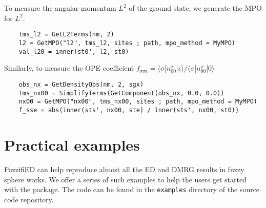 \documentclass{timesjhep}
\begin{document}
To measure the angular momentum $L^2$ of the ground state, we generate the MPO for $L^2$.
\begin{lstlisting}
    tms_l2 = GetL2Terms(nm, 2)
    l2 = GetMPO("l2", tms_l2, sites ; path, mpo_method = MyMPO)
    val_l20 = inner(st0', l2, st0)
\end{lstlisting}
Similarly, to measure the OPE coefficient $f_{\sigma\sigma\epsilon}=\langle \sigma|n^x_{00}|\epsilon\rangle/\langle \sigma|n^x_{00}|0\rangle$
\begin{lstlisting}
    obs_nx = GetDensityObs(nm, 2, sgx)
    tms_nx00 = SimplifyTerms(GetComponent(obs_nx, 0.0, 0.0))
    nx00 = GetMPO("nx00", tms_nx00, sites ; path, mpo_method = MyMPO)
    f_sse = abs(inner(sts', nx00, ste) / inner(sts', nx00, st0))
\end{lstlisting}

\section{Practical examples}
\label{sec:examples}

FuzzifiED can help reproduce almost all the ED and DMRG results in fuzzy sphere works. We offer a series of such examples to help the users get started with the package. The code can be found in the \lstinline|examples| directory of the source code repository. 

\newcommand{\linkexample}[1]{\href{https://github.com/FuzzifiED/FuzzifiED.jl/blob/main/examples/#1}{\lstinline|#1|}}
\end{document}
